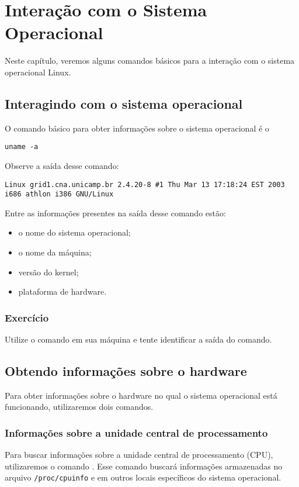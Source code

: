 \chapter{Interação com o Sistema Operacional}
Neste capítulo, veremos alguns comandos básicos para a interação com o sistema operacional Linux. 

\section{Interagindo com o sistema operacional}
O comando básico para obter informações sobre o sistema operacional é o

\begin{lstlisting}[style=MyBashStyle]
uname -a
\end{lstlisting}

Observe a saída desse comando:
\begin{lstlisting}[style=outputStyle]
Linux grid1.cna.unicamp.br 2.4.20-8 #1 Thu Mar 13 17:18:24 EST 2003 i686 athlon i386 GNU/Linux
\end{lstlisting}

Entre as informações presentes na saída desse comando estão:
\begin{itemize}
\setlength{\itemsep}{1pt}\setlength{\parskip}{0pt}  \setlength{\parsep}{0pt}
\item o nome do sistema operacional;
\item o nome da máquina;
\item versão do kernel;
\item plataforma de hardware.
\end{itemize}

\subsection{Exercício}
Utilize o comando  em sua máquina e tente identificar a saída do comando.

\section{Obtendo informações sobre o hardware}
Para obter informações sobre o hardware no qual o sistema operacional está funcionando, utilizaremos dois comandos. 

\subsection{Informações sobre a unidade central de processamento}
Para buscar informações sobre a unidade central de processamento (CPU), utilizaremos o comando  . Esse comando buscará informações armazenadas no arquivo \texttt{/proc/cpuinfo} e em outros locais específicos do sistema operacional.

